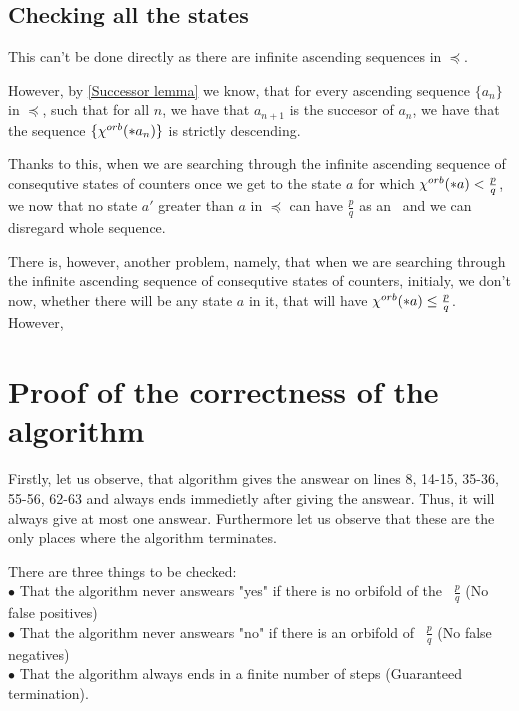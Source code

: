
\subsection{Checking all the states}
This can't be done directly as there are infinite ascending sequences in $\preceq$. 

However, by \ref{Successor lemma} we know, that for every ascending sequence $\{a_n\}$ 
in $\preceq$, such 
that for all $n$, we have that $a_{n+1}$ is the succesor of $a_n$, we have that the sequence 
$\{{\chi^{orb}(*a_n)}\}$ is strictly descending. 

Thanks to this, 
when we are searching through the infinite ascending sequence of consequtive 
states of counters once we get to the state $a$ for which ${\chi^{orb}(*a)} < \frac{p}{q}$, we now 
that no state $a'$ greater than $a$ in $\preceq$ can have $\frac{p}{q}$ as an 
\Eoc\ and we can disregard whole sequence. 

There is, however, another problem, namely, that when we are searching through 
the infinite ascending sequence of consequtive 
states of counters, initialy, we don't now, whether there will be any state $a$ in it, that 
will have ${\chi^{orb}(*a)} \leq \frac{p}{q}$. However, 
\section{Proof of the correctness of the algorithm}
Firstly, let us observe, that algorithm gives the answear on lines 8, 14-15, 35-36, 55-56, 
62-63 and 
always ends immedietly after giving the answear. Thus, it will always give at most one answear.
Furthermore let us observe that these are the only places where the algorithm terminates.
 
There are three things to be checked: \\
$\bullet$ That the algorithm never answears "yes" if there is no orbifold of the \Eoc\ 
$\frac{p}{q}$ (No false positives)\\
$\bullet$ That the algorithm never answears "no" if there is an orbifold of \Eoc\ 
$\frac{p}{q}$ (No false negatives)\\ 
$\bullet$ That the algorithm always ends in a finite number of steps (Guaranteed termination). 




